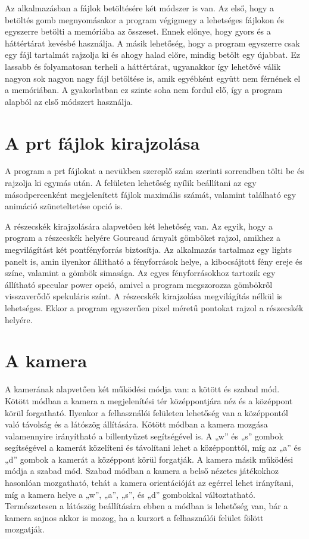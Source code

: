 Az alkalmazásban a fájlok betöltésére két módszer is van. 
Az első, hogy a betöltés gomb megnyomásakor a program végigmegy 
a lehetséges fájlokon és egyszerre betölti 
a memóriába az összeset. 
Ennek előnye, hogy gyors és a háttértárat kevésbé használja. 
A másik lehetőség, 
hogy a program egyszerre csak egy fájl tartalmát rajzolja ki 
és ahogy halad előre, mindig betölt egy újabbat. 
Ez lassabb és folyamatosan terheli a háttértárat, 
ugyanakkor így lehetővé válik nagyon sok nagyon nagy fájl betöltése is, 
amik egyébként együtt nem férnének el a memóriában. 
A gyakorlatban ez szinte soha nem fordul elő, 
így a program alapból az első módszert használja.

\section{A prt fájlok kirajzolása}

A program a prt fájlokat a nevükben szereplő szám szerinti sorrendben tölti be 
és rajzolja ki egymás után. 
A felületen lehetőség nyílik beállítani 
az egy másodpercenként megjelenített fájlok maximális számát,
valamint található egy animáció szüneteltetése opció is.

A részecskék kirajzolására alapvetően két lehetőség van. 
Az egyik,
hogy a program a részecskék helyére Goureaud árnyalt gömböket rajzol, 
amikhez a megvilágítást két pontfényforrás biztosítja. 
Az alkalmazás tartalmaz egy {\ttfamily lights} panelt is, 
amin ilyenkor állítható a fényforrások helye, 
a kibocsájtott fény ereje és színe, valamint a gömbök simasága. 
Az egyes fényforrásokhoz tartozik
egy állítható {\ttfamily specular power} opció, 
amivel a program megszorozza gömbökről visszaverődő spekuláris színt. 
A részecskék kirajzolása megvilágítás nélkül is lehetséges. 
Ekkor a program egyszerűen pixel
méretű pontokat rajzol a részecskék helyére.

\section{A kamera}

A kamerának alapvetően két működési módja van: a kötött és szabad mód. 
Kötött módban a kamera a megjelenítési tér középpontjára néz 
és a középpont körül forgatható. 
Ilyenkor a felhasználói felületen lehetőség van a középpontól való távolság 
és a látószög állítására. 
Kötött módban a kamera mozgása valamennyire irányítható 
a billentyűzet segítségével is. 
A {\ttfamily „w”} és {\ttfamily „s”} gombok segítségével 
a kamerát közelíteni és távolítani lehet a középponttól, 
míg az {\ttfamily „a”} és {\ttfamily „d”} gombok 
a kamerát a középpont körül forgatják. 
A kamera másik működési módja a szabad mód. 
Szabad módban a kamera a belső nézetes játékokhoz hasonlóan mozgatható, 
tehát a kamera orientációját az egérrel lehet irányítani, 
míg a kamera helye a {\ttfamily „w”}, {\ttfamily „a”}, {\ttfamily „s”}, 
és {\ttfamily „d”} gombokkal változtatható. 
Természetesen a látószög beállítására ebben a módban is lehetőség van, 
bár a kamera sajnos akkor is mozog, 
ha a kurzort a felhasználói felület fölött mozgatják.


